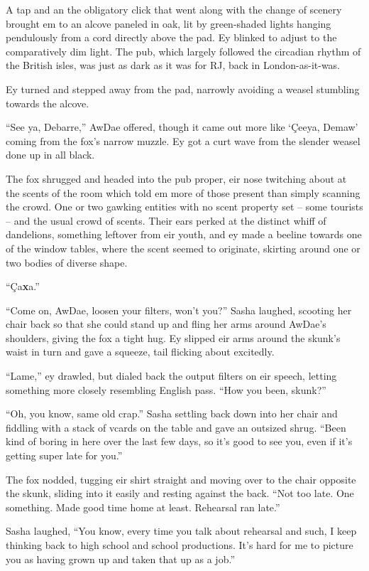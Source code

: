 A tap and an the obligatory click that went along with the change of scenery brought em to an alcove paneled in oak, lit by green-shaded lights hanging pendulously from a cord directly above the pad. Ey blinked to adjust to the comparatively dim light. The pub, which largely followed the circadian rhythm of the British isles, was just as dark as it was for RJ, back in London-as-it-was.

Ey turned and stepped away from the pad, narrowly avoiding a weasel stumbling towards the alcove.

``See ya, Debarre,'' AwDae offered, though it came out more like `\c{C}eeya, Demaw' coming from the fox's narrow muzzle. Ey got a curt wave from the slender weasel done up in all black.

The fox shrugged and headed into the pub proper, eir nose twitching about at the scents of the room which told em more of those present than simply scanning the crowd. One or two gawking entities with no scent property set -- some tourists -- and the usual crowd of scents. Their ears perked at the distinct whiff of dandelions, something leftover from eir youth, and ey made a beeline towards one of the window tables, where the scent seemed to originate, skirting around one or two bodies of diverse shape.

``\c{C}a\textbf{x}a.''

``Come on, AwDae, loosen your filters, won't you?'' Sasha laughed, scooting her chair back so that she could stand up and fling her arms around AwDae's shoulders, giving the fox a tight hug. Ey slipped eir arms around the skunk's waist in turn and gave a squeeze, tail flicking about excitedly.

``Lame,'' ey drawled, but dialed back the output filters on eir speech, letting something more closely resembling English pass. ``How you been, skunk?''

``Oh, you know, same old crap.'' Sasha settling back down into her chair and fiddling with a stack of vcards on the table and gave an outsized shrug. ``Been kind of boring in here over the last few days, so it's good to see you, even if it's getting super late for you.''

The fox nodded, tugging eir shirt straight and moving over to the chair opposite the skunk, sliding into it easily and resting against the back. ``Not too late. One something. Made good time home at least. Rehearsal ran late.''

Sasha laughed, ``You know, every time you talk about rehearsal and such, I keep thinking back to high school and school productions. It's hard for me to picture you as having grown up and taken that up as a job.''

